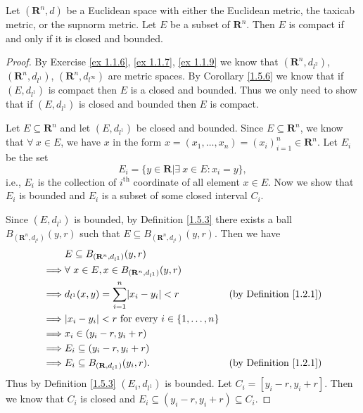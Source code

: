 \begin{theorem}\label{1.5.7}
    Let \((\mathbf{R}^n, d)\) be a Euclidean space with either the Euclidean metric, the taxicab metric, or the supnorm metric.
    Let \(E\) be a subset of \(\mathbf{R}^n\).
    Then \(E\) is compact if and only if it is closed and bounded.
\end{theorem}

\begin{proof}
    By Exercise \ref{ex 1.1.6}, \ref{ex 1.1.7}, \ref{ex 1.1.9} we know that \((\mathbf{R}^n, d_{l^2})\), \((\mathbf{R}^n, d_{l^1})\), \((\mathbf{R}^n, d_{l^\infty})\) are metric spaces.
    By Corollary \ref{1.5.6} we know that if \((E, d_{l^1})\) is compact then \(E\) is a closed and bounded.
    Thus we only need to show that if \((E, d_{l^1})\) is closed and bounded then \(E\) is compact.

    Let \(E \subseteq \mathbf{R}^n\) and let \((E, d_{l^1})\) be closed and bounded.
    Since \(E \subseteq \mathbf{R}^n\), we know that \(\forall\ x \in E\), we have \(x\) in the form \(x = (x_1, \dots, x_n) = (x_i)_{i = 1}^n \in \mathbf{R}^n\).
    Let \(E_i\) be the set
    \[
        E_i = \{y \in \mathbf{R} | \exists\ x \in E : x_i = y\},
    \]
    i.e., \(E_i\) is the collection of \(i^{\text{th}}\) coordinate of all element \(x \in E\).
    Now we show that \(E_i\) is bounded and \(E_i\) is a subset of some closed interval \(C_i\).

    Since \((E, d_{l^1})\) is bounded, by Definition \ref{1.5.3} there exists a ball \(B_{(\mathbf{R}^n, d_{l^1})}(y, r)\) such that \(E \subseteq B_{(\mathbf{R}^n, d_{l^1})}(y, r)\).
    Then we have
    \begin{align*}
                 & E \subseteq B_{(\mathbf{R}^n, d_{l^1})}(y, r)                                                      \\
        \implies & \forall\ x \in E, x \in B_{(\mathbf{R}^n, d_{l^1})}(y, r)                                          \\
        \implies & d_{l^1}(x, y) = \sum_{i = 1}^n \abs*{x_i - y_i} < r           & \text{(by Definition \ref{1.2.1})} \\
        \implies & \abs*{x_i - y_i} < r \text{ for every } i \in \{1, \dots, n\}                                      \\
        \implies & x_i \in (y_i - r, y_i + r)                                                                         \\
        \implies & E_i \subseteq (y_i - r, y_i + r)                                                                   \\
        \implies & E_i \subseteq B_{(\mathbf{R}, d_{l^1})}(y_i, r).              & \text{(by Definition \ref{1.2.1})}
    \end{align*}
    Thus by Definition \ref{1.5.3} \((E_i, d_{l^1})\) is bounded.
    Let \(C_i = [y_i - r, y_i + r]\).
    Then we know that \(C_i\) is closed and \(E_i \subseteq (y_i - r, y_i + r) \subseteq C_i\).


\end{proof}
